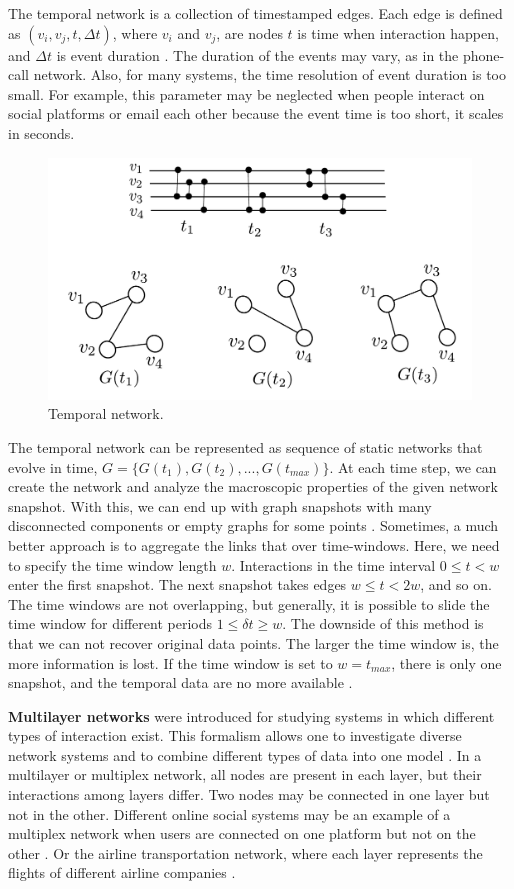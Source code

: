 The temporal network is a collection of timestamped edges. Each edge is defined as $(v_i, v_j, t, \Delta t)$, where $v_i$ and $v_j$, are nodes $t$ is time when interaction happen, and $\Delta t$ is event duration \cite{guide_temporal}. The duration of the events may vary, as in the phone-call network. Also, for many systems, the time resolution of event duration is too small. For example, this parameter may be neglected when people interact on social platforms or email each other because the event time is too short, it scales in seconds.

\begin{figure}[!ht]
	\centering
	\includegraphics[width=0.7\linewidth]{figures/methodology/temporal_network.pdf} 
	\caption{Temporal network. }
	\label{fig:gt3}
\end{figure}

The temporal network can be represented as sequence of static networks that evolve in time, $G = \{ G(t_1), G(t_2), ..., G(t_{max})\}$. At each time step, we can create the network and analyze the macroscopic properties of the given network snapshot. With this, we can end up with graph snapshots with many disconnected components or empty graphs for some points \cite{holme2015modern}. Sometimes, a much better approach is to aggregate the links that over time-windows. Here, we need to specify the time window length $w$. Interactions in the time interval $0\leq t<w$ enter the first snapshot. The next snapshot takes edges $w \leq t <2w$, and so on. The time windows are not overlapping, but generally, it is possible to slide the time window for different periods $ 1 \leq \delta t \geq w$. The downside of this method is that we can not recover original data points. The larger the time window is, the more information is lost. If the time window is set to $w=t_{max}$, there is only one snapshot, and the temporal data are no more available \cite{krings2012effects, arnold2021moving}. 

\textbf{Multilayer networks} were introduced for studying systems in which different types of interaction exist. This formalism allows one to investigate diverse network systems and to combine different types of data into one model \cite{porter2018multilayer}. In a multilayer or multiplex network, all nodes are present in each layer, but their interactions among layers differ. Two nodes may be connected in one layer but not in the other. Different online social systems may be an example of a multiplex network when users are connected on one platform but not on the other \cite{aleta2019multilayer}. Or the airline transportation network, where each layer represents the flights of different airline companies \cite{kivelamultilayer}.   


